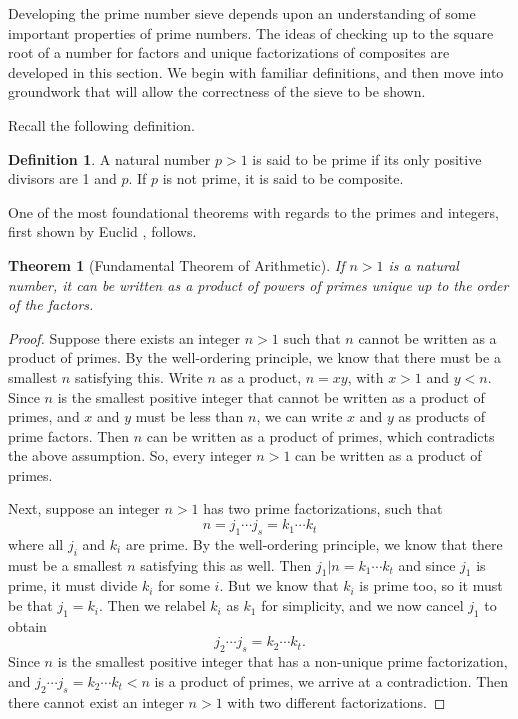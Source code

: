 \documentclass{amsart}
\newtheorem{thm}{Theorem}
\theoremstyle{definition}
\newtheorem{definition}{Definition}[section]
\theoremstyle{case}
\begin{document}
	Developing the prime number sieve depends upon an understanding of some important properties of prime numbers. The ideas of checking up to the square root of a number for factors and unique factorizations of composites are developed in this section. We begin with familiar definitions, and then move into groundwork that will allow the correctness of the sieve to be shown.

	Recall the following definition.
	\begin{definition}
		A natural number $p>1$ is said to be prime if its only positive divisors are 1 and $p$. If $p$ is not prime, it is said to be composite.
	\end{definition}
	
	One of the most foundational theorems with regards to the primes and integers, first shown by Euclid \cite{MR605273}, follows.
	\begin{thm}[Fundamental Theorem of Arithmetic]\label{arith}
		If $n > 1$ is a natural number, it can be written as a product of powers of primes unique up to the order of the factors.
	\end{thm}
	\begin{proof}
		Suppose there exists an integer $n>1$ such that $n$ cannot be written as a product of primes. By the well-ordering principle, we know that there must be a smallest $n$ satisfying this. Write $n$ as a product, $n = xy$, with $x>1$ and $y<n$. Since $n$ is the smallest positive integer that cannot be written as a product of primes, and $x$ and $y$ must be less than $n$, we can write $x$ and $y$ as products of prime factors. Then $n$ can be written as a product of primes, which contradicts the above assumption. So, every integer $n>1$ can be written as a product of primes.
		
		Next, suppose an integer $n>1$ has two prime factorizations, such that
		$$ n = j_1 \cdots j_s = k_1 \cdots k_t $$
		where all $j_i$ and $k_i$ are prime. By the well-ordering principle, we know that there must be a smallest $n$ satisfying this as well. Then $j_1 | n = k_1 \cdots k_t$ and since $j_1$ is prime, it must divide $k_i$ for some $i$. But we know that $k_i$ is prime too, so it must be that $j_1 = k_i$. Then we relabel $k_i$ as $k_1$ for simplicity, and we now cancel $j_1$ to obtain
		$$ j_2 \cdots j_s = k_2 \cdots k_t . $$
		Since $n$ is the smallest positive integer that has a non-unique prime factorization, and $ j_2 \cdots j_s = k_2 \cdots k_t < n $ is a product of primes, we arrive at a contradiction. Then there cannot exist an integer $n>1$ with two different factorizations.
	\end{proof}
\end{document}
